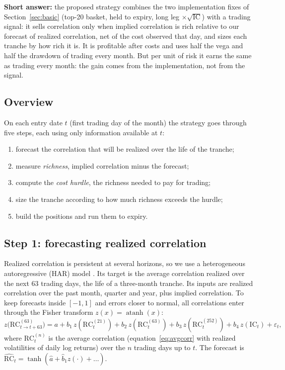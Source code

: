\textbf{Short answer:} the proposed strategy combines the two implementation fixes of Section~\ref{sec:basic} (top-20 basket, held to expiry, long leg $\times\sqrt{\text{IC}}$) with a trading signal: it sells correlation only when implied correlation is rich relative to our forecast of realized correlation, net of the cost observed that day, and sizes each tranche by how rich it is. It is profitable after costs and uses half the vega and half the drawdown of trading every month. But per unit of risk it earns the same as trading every month: the gain comes from the implementation, not from the signal.

\subsection{Overview}

On each entry date $t$ (first trading day of the month) the strategy goes through five steps, each using only information available at $t$:
\begin{enumerate}
  \item forecast the correlation that will be realized over the life of the tranche;
  \item measure \emph{richness}, implied correlation minus the forecast;
  \item compute the \emph{cost hurdle}, the richness needed to pay for trading;
  \item size the tranche according to how much richness exceeds the hurdle;
  \item build the positions and run them to expiry.
\end{enumerate}

\subsection{Step 1: forecasting realized correlation}

Realized correlation is persistent at several horizons, so we use a heterogeneous autoregressive (HAR) model \citep{Corsi2009}. Its target is the average correlation realized over the next 63 trading days, the life of a three-month tranche. Its inputs are realized correlation over the past month, quarter and year, plus implied correlation. To keep forecasts inside $[-1, 1]$ and errors closer to normal, all correlations enter through the Fisher transform $z(x) = \operatorname{atanh}(x)$:
\begin{equation}\label{eq:har}
  z\bigl(\mathrm{RC}^{(63)}_{t \to t+63}\bigr) = a + b_1\, z(\mathrm{RC}^{(21)}_t) + b_2\, z(\mathrm{RC}^{(63)}_t) + b_3\, z(\mathrm{RC}^{(252)}_t) + b_4\, z(\mathrm{IC}_t) + \varepsilon_t,
\end{equation}
where $\mathrm{RC}^{(n)}_t$ is the average correlation (equation~\eqref{eq:avgcorr} with realized volatilities of daily log returns) over the $n$ trading days up to $t$. The forecast is $\widehat{\mathrm{RC}}_t = \tanh(\hat a + \hat b_1 z(\cdot) + \dots)$.

